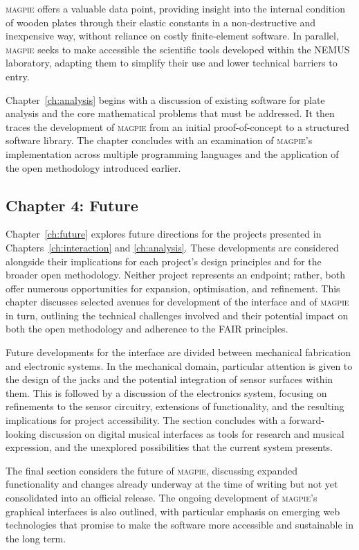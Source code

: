\textsc{magpie} offers a valuable data point, providing insight into the
internal condition of wooden plates through their elastic constants in a
non-destructive and inexpensive way, without reliance on costly finite-element
software. In parallel, \textsc{magpie} seeks to make accessible the scientific
tools developed within the NEMUS laboratory, adapting them to simplify their use
and lower technical barriers to entry.

Chapter~\ref{ch:analysis} begins with a discussion of existing software for
plate analysis and the core mathematical problems that must be addressed. It
then traces the development of \textsc{magpie} from an initial proof-of-concept
to a structured software library. The chapter concludes with an examination of
\textsc{magpie}’s implementation across multiple programming languages and the
application of the open methodology introduced earlier.

\subsection{Chapter 4: Future}

Chapter~\ref{ch:future} explores future directions for the projects presented in
Chapters~\ref{ch:interaction} and \ref{ch:analysis}. These developments are
considered alongside their implications for each project’s design principles and
for the broader open methodology. Neither project represents an endpoint;
rather, both offer numerous opportunities for expansion, optimisation, and
refinement. This chapter discusses selected avenues for development of the
interface and of \textsc{magpie} in turn, outlining the technical challenges
involved and their potential impact on both the open methodology and adherence
to the FAIR principles.

Future developments for the interface are divided between mechanical fabrication
and electronic systems. In the mechanical domain, particular attention is given
to the design of the jacks and the potential integration of sensor surfaces
within them. This is followed by a discussion of the electronics system,
focusing on refinements to the sensor circuitry, extensions of functionality,
and the resulting implications for project accessibility. The section concludes
with a forward-looking discussion on digital musical interfaces as tools for
research and musical expression, and the unexplored possibilities that the
current system presents.

The final section considers the future of \textsc{magpie}, discussing expanded
functionality and changes already underway at the time of writing but not yet
consolidated into an official release. The ongoing development of
\textsc{magpie}’s graphical interfaces is also outlined, with particular
emphasis on emerging web technologies that promise to make the software more
accessible and sustainable in the long term.

